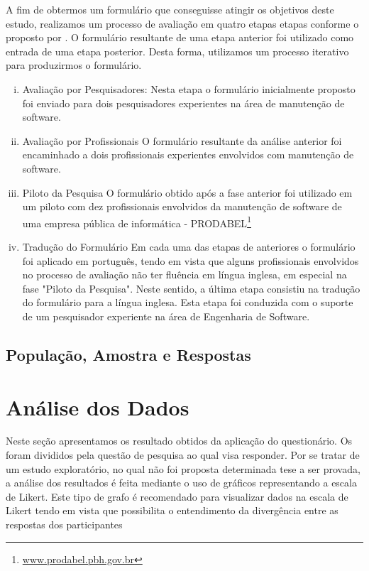 A fim de obtermos um formulário que conseguisse atingir os objetivos deste estudo, realizamos um
processo de avaliação em quatro etapas etapas conforme o proposto por \cite{Thesis2014}. O formulário resultante de uma etapa anterior foi utilizado como entrada de uma etapa posterior. Desta forma, utilizamos um processo iterativo para produzirmos o formulário.
\begin{enumerate}[(i)]
	\item Avaliação por Pesquisadores: Nesta etapa o formulário inicialmente proposto foi enviado para dois pesquisadores experientes na área de manutenção de software.
	\item Avaliação por Profissionais O formulário resultante da análise anterior foi encaminhado a dois profissionais experientes envolvidos com manutenção de software. 
	\item Piloto da Pesquisa O formulário obtido após a fase anterior foi utilizado em um piloto com dez profissionais envolvidos da manutenção de software de uma empresa pública de informática - PRODABEL\footnote{\url{www.prodabel.pbh.gov.br}}
	\item Tradução do Formulário Em cada uma das etapas de anteriores o formulário foi aplicado em português, tendo em vista que alguns profissionais envolvidos no processo de avaliação não ter fluência em língua inglesa, em especial na fase "Piloto da Pesquisa". Neste sentido, a última etapa  consistiu na tradução do formulário para a língua inglesa.  Esta etapa foi conduzida com  o suporte de um pesquisador experiente na área de Engenharia de Software.	
\end{enumerate}


\subsection{População, Amostra e Respostas}
\label{subsec:populacao_amostra_respostas}


\section{Análise dos Dados}
\label{sec:analise_dados}

Neste seção apresentamos os resultado obtidos da aplicação do questionário. Os foram divididos pela questão de pesquisa ao qual visa responder. Por se tratar de um estudo exploratório, no qual não foi proposta determinada tese a ser provada, a análise dos resultados é feita mediante o uso de gráficos representando a escala de Likert. Este tipo de grafo é recomendado para visualizar dados na escala de Likert tendo em vista que possibilita o entendimento da divergência entre as respostas dos participantes \cite{robbins2011plotting}

